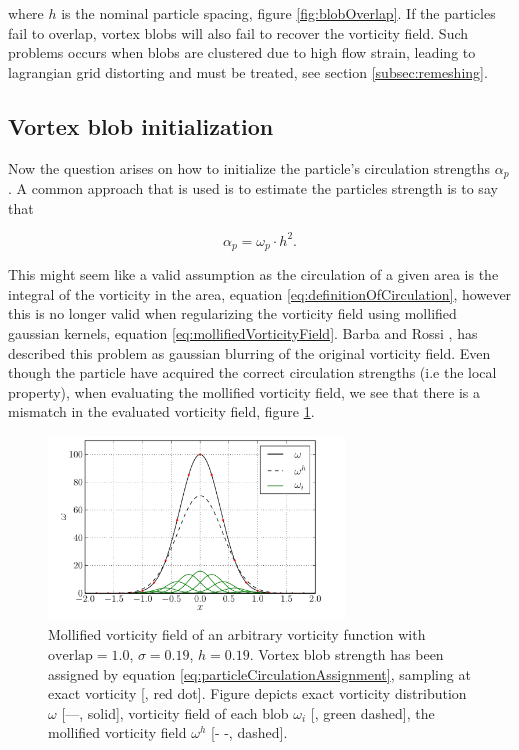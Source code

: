 	
where $h$ is the nominal particle spacing, figure \ref{fig:blobOverlap}. If the particles fail to overlap, vortex blobs will also fail to recover the vorticity field. Such problems occurs when blobs are clustered due to high flow strain, leading to lagrangian grid distorting and must be treated, see section \ref{subsec:remeshing}.


\subsection{Vortex blob initialization}

Now the question arises on how to initialize the particle's circulation strengths $\alpha_p$. A common approach that is used is to estimate the particles strength is to say that

	\begin{equation}
	\alpha_p = \omega_p\cdot h^2.
	\label{eq:particleCirculationAssignment}
	\end{equation}

This might seem like a valid assumption as the circulation of a given area is the integral of the vorticity in the area, equation \ref{eq:definitionOfCirculation}, however this is no longer valid when regularizing the vorticity field using mollified gaussian kernels, equation \ref{eq:mollifiedVorticityField}. Barba and Rossi \cite{Barba2010}, has described this problem as gaussian blurring of the original vorticity field. Even though the particle have acquired the correct circulation strengths (i.e the local property), when evaluating the mollified vorticity field, we see that there is a mismatch in the evaluated vorticity field, figure \ref{fig:particleInitialization}. 


	\begin{figure}[t]
	\centering
	\includegraphics[width=0.7\textwidth]{figures/lagrangian/particleInitialization.pdf}
	\caption{Mollified vorticity field of an arbitrary vorticity function with $\mathrm{overlap}=1.0$, $\sigma=0.19$, $h=0.19$. Vortex blob strength has been assigned by equation \ref{eq:particleCirculationAssignment}, sampling at exact vorticity [{\color{red}{$\bullet$}}, red dot]. Figure depicts exact vorticity distribution $\omega$ [---, solid], vorticity field of each blob $\omega_i$ [{\color{darkgreen}{---}}, green dashed], the mollified vorticity field $\omega^h$ [- -, dashed].  }
	\label{fig:particleInitialization}
	\end{figure}

